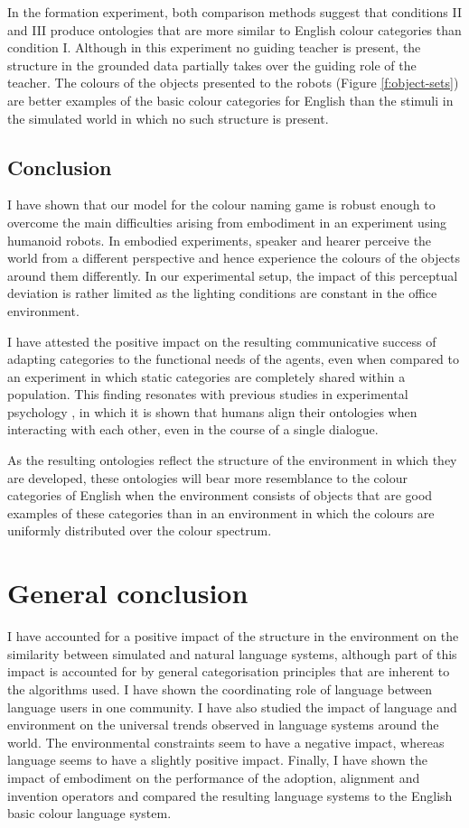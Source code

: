 In the formation experiment, both comparison methods suggest that
conditions II and III produce ontologies that are more similar to
English colour categories than condition I. Although in this
experiment no guiding teacher is present, the structure in the
grounded data partially takes over the guiding role of the
teacher. The colours of the objects presented to the robots (Figure
\ref{f:object-sets}) are better examples of the basic colour
categories for English than the stimuli in the simulated world in
which no such structure is present.

\subsection{Conclusion}

I have shown that our model for the colour naming game is robust
enough to overcome the main difficulties arising from embodiment in an
experiment using humanoid robots. In embodied experiments, speaker and
hearer perceive the world from a different perspective and hence
experience the colours of the objects around them differently. In our
experimental setup, the impact of this perceptual deviation is rather
limited as the lighting conditions are constant in the office
environment.

I have attested the positive impact on the resulting communicative
success of adapting categories to the functional needs of the agents,
even when compared to an experiment in which static categories are
completely shared within a population. This finding resonates with
previous studies in experimental psychology
\citep{garrod94conversation}, in which it is shown that humans align
their ontologies when interacting with each other, even in the course
of a single dialogue.

As the resulting ontologies reflect the structure of the environment
in which they are developed, these ontologies will bear more
resemblance to the colour categories of English when the environment
consists of objects that are good examples of these categories than in
an environment in which the colours are uniformly distributed over the
colour spectrum.

\section{General conclusion}

I have accounted for a positive impact of the structure in the
environment on the similarity between simulated and natural language
systems, although part of this impact is accounted for by general
categorisation principles that are inherent to the algorithms used. I
have shown the coordinating role of language between language users in
one community. I have also studied the impact of language and
environment on the universal trends observed in language systems
around the world. The environmental constraints seem to have a
negative impact, whereas language seems to have a slightly positive
impact. Finally, I have shown the impact of embodiment on the
performance of the adoption, alignment and invention operators and
compared the resulting language systems to the English basic colour
language system.

\newpage
\thispagestyle{empty}